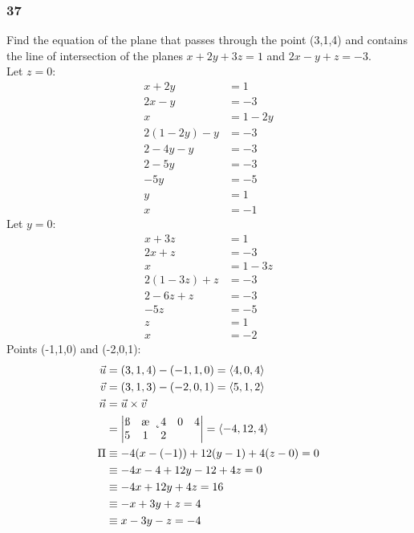 \documentclass[letterpaper, 12pt]{math}
\begin{document}
\subsubsection*{37}
Find the equation of the plane that passes through the point (3,1,4) and
contains the line of intersection of the planes \( x+2y+3z = 1 \) and
\( 2x-y+z = -3 \). \\
Let \( z = 0 \):
\begin{align*}
  x+2y &= 1 \\
  2x-y &= -3 \\
  x &= 1-2y \\
  2(1-2y)-y &= -3 \\
  2-4y-y &= -3 \\
  2-5y &= -3 \\
  -5y &= -5 \\
  y &= 1 \\
  x &= -1
\end{align*}
Let \( y = 0 \):
\begin{align*}
  x+3z &= 1 \\
  2x+z &= -3 \\
  x &= 1-3z \\
  2(1-3z)+z &= -3 \\
  2-6z+z &= -3 \\
  -5z &= -5 \\
  z &= 1 \\
  x &= -2
\end{align*}
Points (-1,1,0) and (-2,0,1):
\begin{align*}
  \vec{u} &= (3,1,4)-(-1,1,0) = \langle4,0,4\rangle \\
  \vec{v} &= (3,1,3)-(-2,0,1) = \langle5,1,2\rangle \\
  \vec{n} &= \vec{u}\times\vec{v} \\
  &= \begin{vmatrix}
    \i & \j & \k \\
    4 & 0 & 4 \\
    5 & 1 & 2 \\
  \end{vmatrix} = \langle-4,12,4\rangle \\
  \Pi &\equiv -4(x-(-1))+12(y-1)+4(z-0) = 0 \\
  &\equiv -4x-4+12y-12+4z = 0 \\
  &\equiv -4x+12y+4z = 16 \\
  &\equiv -x+3y+z = 4 \\
  &\equiv x-3y-z = -4
\end{align*}
\end{document}
